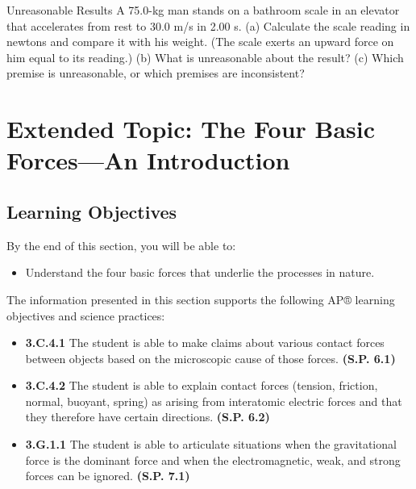 \documentclass[
]{book}
\providecommand{\tightlist}{%
  \setlength{\itemsep}{0pt}\setlength{\parskip}{0pt}}
\newenvironment{learning-objectives}{}{}
\newenvironment{problems-exercises}{}{}
\newenvironment{tinysection}{}{}
\begin{document}
\begin{problems-exercises}
\begin{tinysection}
\end{tinysection}

\hypertarget{fs-id1890360}{}
\hypertarget{fs-id1890362}{}
\begin{tinysection}

{Unreasonable Results} A 75.0-kg man stands on a
bathroom scale in an elevator that accelerates from rest to 30.0 m/s in
2.00 s. (a) Calculate the scale reading in newtons and compare it with
his weight. (The scale exerts an upward force on him equal to its
reading.) (b) What is unreasonable about the result? (c) Which premise
is unreasonable, or which premises are inconsistent?

\end{tinysection}

\end{problems-exercises}

\hypertarget{extended-topic-the-four-basic-forcesan-introduction}{%
\section{Extended Topic: The Four Basic Forces---An Introduction}\label{extended-topic-the-four-basic-forcesan-introduction}}

\hypertarget{fs-id1910513}{}
\begin{learning-objectives}

\hypertarget{learning-objectives-20}{%
\subsection{Learning Objectives}\label{learning-objectives-20}}

By the end of this section, you will be able to:

\begin{itemize}
\tightlist
\item
  Understand the four basic forces that underlie the processes in
  nature.
\end{itemize}

The information presented in this section supports the following AP®
learning objectives and science practices:

\begin{itemize}
\tightlist
\item
  \textbf{3.C.4.1} The student is able to make claims about various contact
  forces between objects based on the microscopic cause of those
  forces. \textbf{(S.P. 6.1)}
\item
  \textbf{3.C.4.2} The student is able to explain contact forces (tension,
  friction, normal, buoyant, spring) as arising from interatomic
  electric forces and that they therefore have certain directions.
  \textbf{(S.P. 6.2)}
\item
  \textbf{3.G.1.1} The student is able to articulate situations when the
  gravitational force is the dominant force and when the
  electromagnetic, weak, and strong forces can be ignored. \textbf{(S.P.
  7.1)}
\end{itemize}

\end{learning-objectives}
\end{document}
